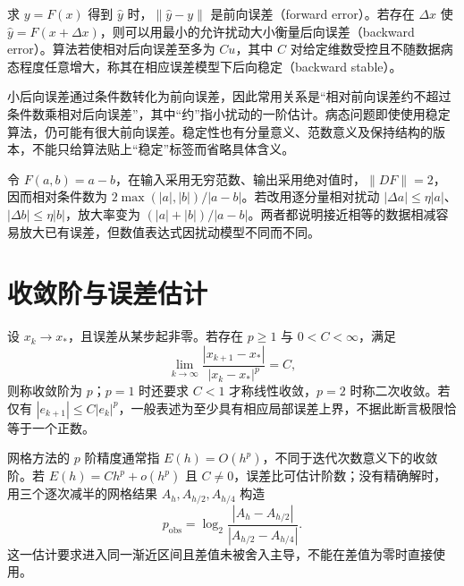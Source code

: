 \begin{definition}
求 $y=F(x)$ 得到 $\widehat y$ 时，$\|\widehat y-y\|$ 是前向误差（forward error）。若存在 $\Delta x$ 使 $\widehat y=F(x+\Delta x)$，则可以用最小的允许扰动大小衡量后向误差（backward error）。算法若使相对后向误差至多为 $Cu$，其中 $C$ 对给定维数受控且不随数据病态程度任意增大，称其在相应误差模型下后向稳定（backward stable）。
\end{definition}

小后向误差通过条件数转化为前向误差，因此常用关系是“相对前向误差约不超过条件数乘相对后向误差”，其中“约”指小扰动的一阶估计。病态问题即使使用稳定算法，仍可能有很大前向误差。稳定性也有分量意义、范数意义及保持结构的版本，不能只给算法贴上“稳定”标签而省略具体含义。

\begin{example}[相减问题的条件数]
令 $F(a,b)=a-b$，在输入采用无穷范数、输出采用绝对值时，$\|DF\|=2$，因而相对条件数为 $2\max(|a|,|b|)/|a-b|$。若改用逐分量相对扰动 $|\Delta a|\le\eta|a|$、$|\Delta b|\le\eta|b|$，放大率变为 $(|a|+|b|)/|a-b|$。两者都说明接近相等的数据相减容易放大已有误差，但数值表达式因扰动模型不同而不同。
\end{example}

\section{收敛阶与误差估计}
\begin{definition}[迭代的收敛阶]
设 $x_k\to x_*$，且误差从某步起非零。若存在 $p\ge1$ 与 $0<C<\infty$，满足
\[
 \lim_{k\to\infty}\frac{|x_{k+1}-x_*|}{|x_k-x_*|^p}=C,
\]
则称收敛阶为 $p$；$p=1$ 时还要求 $C<1$ 才称线性收敛，$p=2$ 时称二次收敛。若仅有 $|e_{k+1}|\le C|e_k|^p$，一般表述为至少具有相应局部误差上界，不据此断言极限恰等于一个正数。
\end{definition}

网格方法的 $p$ 阶精度通常指 $E(h)=O(h^p)$，不同于迭代次数意义下的收敛阶。若 $E(h)=Ch^p+o(h^p)$ 且 $C\ne0$，误差比可估计阶数；没有精确解时，用三个逐次减半的网格结果 $A_h,A_{h/2},A_{h/4}$ 构造
\[
 p_{\mathrm{obs}}=\log_2\frac{|A_h-A_{h/2}|}{|A_{h/2}-A_{h/4}|}.
\]
这一估计要求进入同一渐近区间且差值未被舍入主导，不能在差值为零时直接使用。

